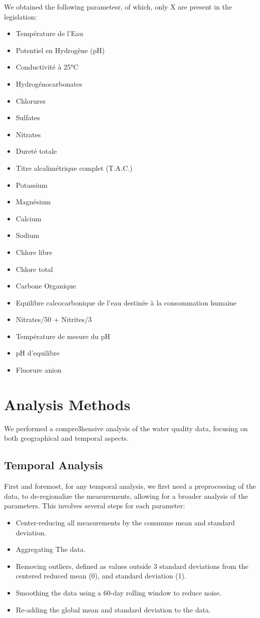 \documentclass{article}
\begin{document}
We obtained the following parametesr, of which, only X are present in the legislation:
\begin{itemize}
    \item Température de l'Eau
    \item Potentiel en Hydrogène (pH)
    \item Conductivité à 25°C
    \item Hydrogénocarbonates
    \item Chlorures
    \item Sulfates
    \item Nitrates
    \item Dureté totale
    \item Titre alcalimétrique complet (T.A.C.)
    \item Potassium
    \item Magnésium
    \item Calcium
    \item Sodium
    \item Chlore libre
    \item Chlore total
    \item Carbone Organique
    \item Equilibre calcocarbonique de l’eau destinée à la consommation humaine
    \item Nitrates/50 + Nitrites/3
    \item Température de mesure du pH
    \item pH d'equilibre
    \item Fluorure anion
\end{itemize}

\newpage
\section{Analysis Methods}
We performed a compre3hensive analysis of the water quality data, focusing on both geographical and temporal aspects.

\subsection{Temporal Analysis}

First and foremost, for any temporal analysis, we first need a preprocessing of the data, to de-regionalize the measurements, allowing for a broader analysis of the parameters.
This involves several steps for each parameter:
\begin{itemize}
    \item Center-reducing all measurements by the commune mean and standard deviation.
    \item Aggregating The data.
    \item Removing outliers, defined as values outside 3 standard deviations from the centered reduced mean (0), and standard deviation (1).
    \item Smoothing the data using a 60-day rolling window to reduce noise.
    \item Re-adding the global mean and standard deviation to the data.
\end{itemize}
\end{document}
